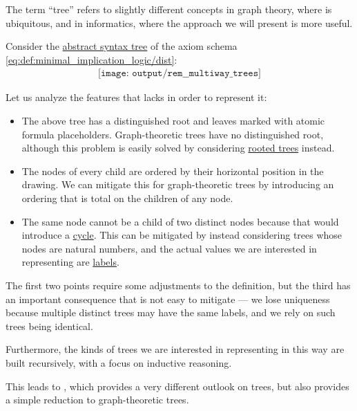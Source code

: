 \begin{remark}\label{rem:multiway_trees}
  The term \enquote{tree} refers to slightly different concepts in graph theory, where  is ubiquitous, and in informatics, where the approach we will present is more useful.

  Consider the \hyperref[con:abstract_syntax_tree]{abstract syntax tree} of the axiom schema \eqref{eq:def:minimal_implication_logic/dist}:
  \begin{equation}\label{eq:rem:multiway_trees/dist}
    \begin{aligned}
      \texttt{[image: output/rem\_\_multiway\_trees]}
    \end{aligned}
  \end{equation}

  Let us analyze the features that  lacks in order to represent it:
  \begin{itemize}
    \item The above tree has a distinguished root and leaves marked with atomic formula placeholders. Graph-theoretic trees have no distinguished root, although this problem is easily solved by considering \hyperref[def:rooted_tree]{rooted trees} instead.
    \item The nodes of every child are ordered by their horizontal position in the drawing. We can mitigate this for graph-theoretic trees by introducing an ordering that is total on the children of any node.
    \item The same node cannot be a child of two distinct nodes because that would introduce a \hyperref[def:graph_cycle]{cycle}. This can be mitigated by instead considering trees whose nodes are natural numbers, and the actual values we are interested in representing are \hyperref[def:labeled_set]{labels}.
  \end{itemize}

  The first two points require some adjustments to the definition, but the third has an important consequence that is not easy to mitigate --- we lose uniqueness because multiple distinct trees may have the same labels, and we rely on such trees being identical.

  Furthermore, the kinds of trees we are interested in representing in this way are built recursively, with a focus on inductive reasoning.

  This leads to , which provides a very different outlook on trees, but also provides a simple reduction to graph-theoretic trees.
\end{remark}


